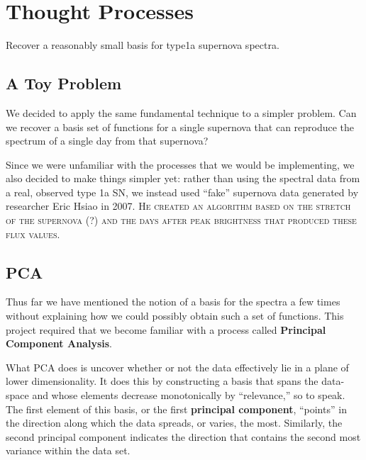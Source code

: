 \documentclass{article}
\newcommand{\defn}[1]{\textbf{#1}}
\begin{document}
\section{Thought Processes}
\label{sec:thinking}

Recover a reasonably small basis for type1a supernova spectra.

\vspace{5mm}


  \subsection{A Toy Problem}
  \label{sec:hsiao}
  We decided to apply the same fundamental technique to a simpler
  problem.  Can we recover a basis set of functions for a single
  supernova that can reproduce the spectrum of a single day from that
  supernova?

  Since we were unfamiliar with the processes that we would be
  implementing, we also decided to make things simpler yet: rather
  than using the spectral data from a real, observed type 1a SN, we
  instead used ``fake'' supernova data generated by researcher Eric
  Hsiao in 2007.  \textsc{He created an algorithm based on the stretch
    of the supernova (?) and the days after peak brightness that
    produced these flux values.}

  \subsection{PCA}
  \label{sec:pca}

  Thus far we have mentioned the notion of a basis for the spectra a
  few times without explaining how we could possibly obtain such a set
  of functions.  This project required that we become familiar with a
  process called \defn{Principal Component Analysis}.

  What PCA does is uncover whether or not the data effectively lie in
  a plane of lower dimensionality.  It does this by constructing a
  basis that spans the data-space and whose elements decrease
  monotonically by ``relevance,'' so to speak.  The first element of
  this basis, or the first \defn{principal component}, ``points'' in
  the direction along which the data spreads, or varies, the
  most.  Similarly, the second principal component indicates the
  direction that contains the second most variance within the data
  set.
\end{document}
